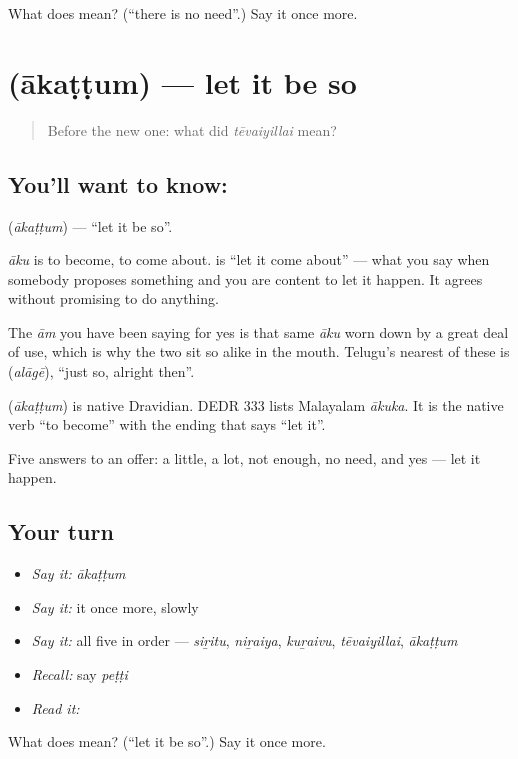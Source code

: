 \begin{tcolorbox}[breakable,colback=teal!4,colframe=teal!35!black,title={Before you move on}]
What does  mean? (\textquotedblleft{}there is no need\textquotedblright{}.) Say it once more.
\end{tcolorbox}
\section[\texorpdfstring{\ta{ஆகட்டும்} (ākaṭṭum)}{ஆகட்டும் (ākaṭṭum)}]{ (ākaṭṭum) — let it be so}

\label{lesson:TA-C56-let-it-be}



\begin{quote}
Before the new one: what did \emph{tēvaiyillai} mean?
\end{quote}

\subsection*{You'll want to know: }
\textbf{} (\emph{ākaṭṭum}) — \textquotedblleft{}let it be so\textquotedblright{}.

\emph{āku} is to become, to come about.  is \textquotedblleft{}let it come about\textquotedblright{} — what you say when somebody proposes something and you are content to let it happen. It agrees without promising to do anything.

The \emph{ām} you have been saying for yes is that same \emph{āku} worn down by a great deal of use, which is why the two sit so alike in the mouth. Telugu's nearest of these is  (\emph{alāgē}), \textquotedblleft{}just so, alright then\textquotedblright{}.

\begin{cousinweb}
\textbf{} (\emph{ākaṭṭum}) is native Dravidian. DEDR 333 lists Malayalam \emph{ākuka}. It is the native verb \textquotedblleft{}to become\textquotedblright{} with the ending that says \textquotedblleft{}let it\textquotedblright{}.
\end{cousinweb}

\begin{grammarlens}[title={What you've built}]
Five answers to an offer: a little, a lot, not enough, no need, and yes — let it happen.
\end{grammarlens}

\subsection*{Your turn}
\begin{itemize}
\raggedright
  \item \emph{Say it:} \emph{ākaṭṭum}
  \item \emph{Say it:} it once more, slowly
  \item \emph{Say it:} all five in order — \emph{siṟitu}, \emph{niṟaiya}, \emph{kuṟaivu}, \emph{tēvaiyillai}, \emph{ākaṭṭum}
  \item \emph{Recall:} say \emph{peṭṭi}
  \item \emph{Read it:} \textbf{}
\end{itemize}

\begin{tcolorbox}[breakable,colback=teal!4,colframe=teal!35!black,title={Before you move on}]
What does  mean? (\textquotedblleft{}let it be so\textquotedblright{}.) Say it once more.
\end{tcolorbox}
